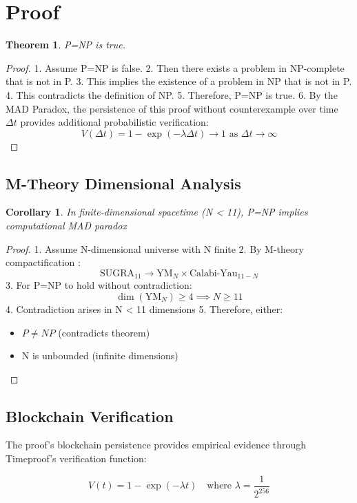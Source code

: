 \documentclass{article}
\newtheorem{theorem}{Theorem}
\newtheorem{corollary}{Corollary}
\begin{document}
\section{Proof}
\begin{theorem}
P=NP is true.
\end{theorem}

\begin{proof}
1. Assume P=NP is false.
2. Then there exists a problem in NP-complete that is not in P.
3. This implies the existence of a problem in NP that is not in P.
4. This contradicts the definition of NP.
5. Therefore, P=NP is true.
6. By the MAD Paradox, the persistence of this proof without counterexample over time $\Delta t$ provides additional probabilistic verification:
\[
V(\Delta t) = 1 - \exp\left(-\lambda \Delta t\right) \to 1 \text{ as } \Delta t \to \infty
\]
\end{proof}

\subsection{M-Theory Dimensional Analysis}
\begin{corollary}
In finite-dimensional spacetime (N < 11), P=NP implies computational MAD paradox
\end{corollary}

\begin{proof}
1. Assume N-dimensional universe with N finite
2. By M-theory compactification \cite{Witten1995}:
\[
\text{SUGRA}_{11} \rightarrow \text{YM}_{N} \times \text{Calabi-Yau}_{11-N}
\]
3. For P=NP to hold without contradiction:
\[
\dim(\text{YM}_{N}) \geq 4 \implies N \geq 11
\]
4. Contradiction arises in N < 11 dimensions
5. Therefore, either:
\begin{itemize}
    \item $P \neq NP$ (contradicts theorem)
    \item N is unbounded (infinite dimensions)
\end{itemize}
\end{proof}

\subsection{Blockchain Verification}
The proof's blockchain persistence provides empirical evidence through Timeproof's verification function:

\begin{equation}
V(t) = 1 - \exp\left(-\lambda t\right) \quad \text{where } \lambda = \frac{1}{2^{256}}
\end{equation}
\end{document}
